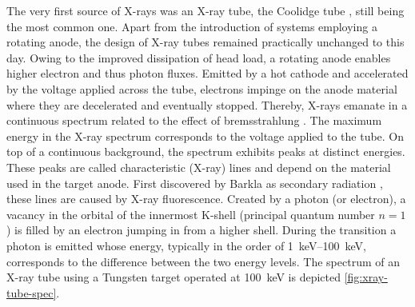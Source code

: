 \documentclass[
twoside,
openright,
titlepage,
numbers=noenddot,
headinclude,
fleqn,
a4paper,
footinclude=true,
cleardoublepage=empty,
abstractoff,
BCOR=5mm,
paper=a4,
fontsize=11pt,
british,ngerman,american,
]{scrreprt}
\begin{document}
The very first source of X-rays was an X-ray tube, \eg{} the Coolidge
tube \cite{Coolidge1917}, still being the most common one.  Apart from
the introduction of systems employing a rotating anode, the design of
X-ray tubes remained practically unchanged to this day.
Owing to the improved dissipation of head load, a rotating anode
enables higher electron and thus photon fluxes.  Emitted by a hot
cathode and accelerated by the voltage applied across the tube,
electrons impinge on the anode material where they are decelerated and
eventually stopped.  Thereby, X-rays emanate in a continuous spectrum
related to the effect of bremsstrahlung \cite{Jackson}.  The
maximum energy in the X-ray spectrum corresponds to the voltage
applied to the tube.
On top of a continuous background, the spectrum exhibits peaks at
distinct energies.  These peaks are called characteristic (X-ray)
lines and depend on the material used in the target anode.  First
discovered by Barkla as secondary radiation
\cite{Barkla1904,Barkla1905}, these lines are caused by X-ray
fluorescence. Created by a photon (or electron), a vacancy in the
orbital of the innermost K-shell (principal quantum number $n=1$) is
filled by an electron jumping in from a higher shell.  During the
transition a photon is emitted whose energy, typically in the order of
\SIrange{1}{100}{keV}, corresponds to the difference between the two
energy levels.  The spectrum of an X-ray tube using a Tungsten
target operated at \SI{100}{\kilo\eV} is depicted
\cref{fig:xray-tube-spec}.
\end{document}
